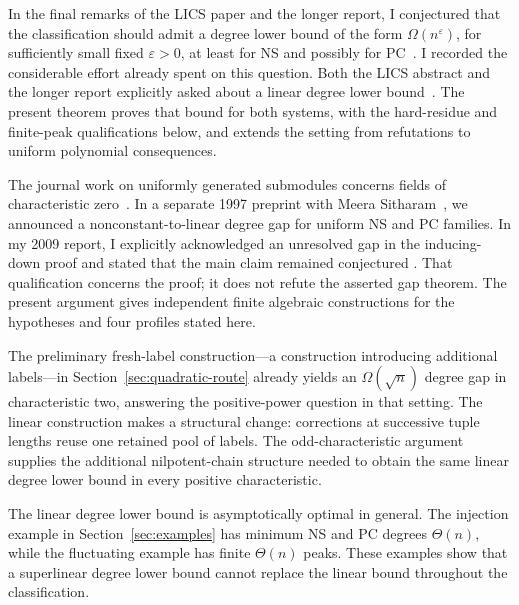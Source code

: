 In the final remarks of the LICS paper and the longer report, I
conjectured that the classification should admit a degree lower bound
of the form $\Omega(n^\varepsilon)$, for sufficiently small fixed $\varepsilon>0$,
at least for NS and possibly for PC~\cite[Section~8]{Riis}\cite[Section~9]{RiisLong}.
I recorded the considerable effort already spent on this question.
Both the LICS abstract and the longer report explicitly asked about a
linear degree lower bound~\cite{Riis,RiisLong}.
The present theorem proves that bound for both systems, with the
hard-residue and finite-peak qualifications below, and extends the
setting from refutations to uniform polynomial consequences.

The journal work on uniformly generated submodules concerns fields of
characteristic zero~\cite{RiisSitharamModules}. In a separate 1997
preprint with Meera Sitharam~\cite{RiisSitharam1997}, we announced a
nonconstant-to-linear degree gap for uniform NS and PC families.
In my 2009 report, I explicitly acknowledged an unresolved gap in the
inducing-down proof and stated that the main claim remained conjectured
\cite[p.~50, footnote~3; p.~53, reference~33]{RiisLong}.
That qualification concerns the proof; it does not refute the asserted
gap theorem. The present argument gives independent finite algebraic
constructions for the hypotheses and four profiles stated here.

The preliminary fresh-label construction---a construction introducing
additional labels---in Section~\ref{sec:quadratic-route} already yields an $\Omega(\sqrt n)$
degree gap in characteristic two, answering the positive-power question
in that setting. The linear construction makes a structural change:
corrections at successive tuple lengths reuse one retained pool of labels.
The odd-characteristic argument supplies the additional nilpotent-chain
structure needed to obtain the same linear degree lower bound in every
positive characteristic.

The linear degree lower bound is asymptotically optimal in general. The
injection example in Section~\ref{sec:examples} has minimum NS and PC
degrees $\Theta(n)$, while the fluctuating example has finite
$\Theta(n)$ peaks. These examples show that a superlinear degree lower
bound cannot replace the linear bound throughout the classification.

